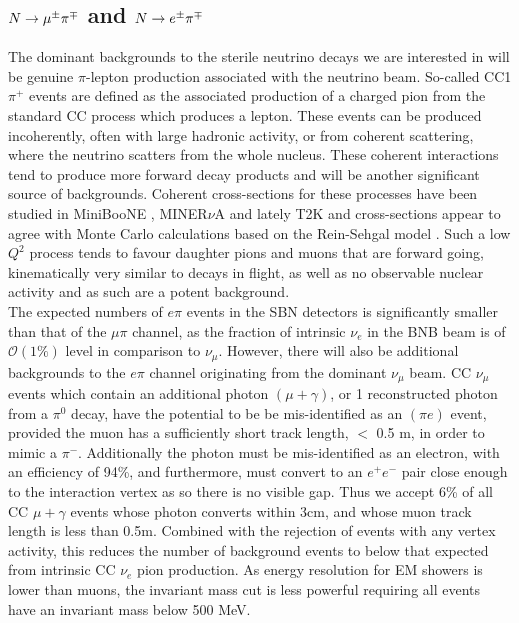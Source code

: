 \documentclass[11pt, a4paper]{article}
\def\minerva{MINER$\nu$A}
\def\ster{\ensuremath N}
\begin{document}
\subsection{$\ster \rightarrow \mu^\pm \pi^\mp$ and $\ster \rightarrow e^\pm \pi^\mp$   }

The dominant backgrounds to the sterile neutrino decays we are interested in will be
genuine $\pi$-lepton production associated with the neutrino beam. So-called
CC1$\pi^+$ events are defined as the associated production of a charged pion
from the standard CC process which produces a lepton. These events can be
produced incoherently, often with large hadronic activity, or from coherent
scattering, where the neutrino scatters from the whole nucleus. These coherent
interactions tend to produce more forward decay products and will be another
significant source of backgrounds. Coherent cross-sections for these processes
have been studied in MiniBooNE \cite{Wascko:2006tx}, \minerva
\cite{Eberly:2014mra} and lately T2K and cross-sections appear to agree with
Monte Carlo calculations based on the Rein-Sehgal model \cite{Rein:2006di,
Rein:1982pf}.  Such a low $Q^2$ process tends to favour daughter pions and
muons that are forward going, kinematically very similar to decays in flight,
as well as no observable nuclear activity and as such are a potent
background.\\ 

The expected numbers of $e \pi$ events in the SBN detectors is significantly
smaller than that of the $\mu \pi$ channel, as the fraction of intrinsic
$\nu_e$ in the BNB beam is of $\mathcal{O}(1\%)$ level in comparison to
$\nu_\mu$. However, there will also be additional backgrounds to the $e \pi$
channel originating from the dominant $\nu_\mu$ beam. CC $\nu_\mu$ events which
contain an additional photon $(\mu+\gamma)$, or 1 reconstructed photon from a
$\pi^0$ decay, have the potential to be be mis-identified as an $(\pi e)$
event, provided the muon has a sufficiently short track length, $<$ 0.5 m, in
order to mimic a $\pi^-$. Additionally the photon must be mis-identified as an
electron, with an efficiency of 94\%, and furthermore, must convert to an
$e^+e^-$ pair close enough to the interaction vertex as so there is no visible
gap. Thus we accept 6\% of all CC $\mu+\gamma$ events whose photon converts
within 3cm, and whose muon track length is less than 0.5m. Combined with the
rejection of events with any vertex activity, this reduces the number of
background events to below that expected from intrinsic CC $\nu_e$ pion
production. As energy resolution for EM showers is lower than muons, the
invariant mass cut is less powerful requiring all events have an invariant mass
below 500 MeV. 
\end{document}
